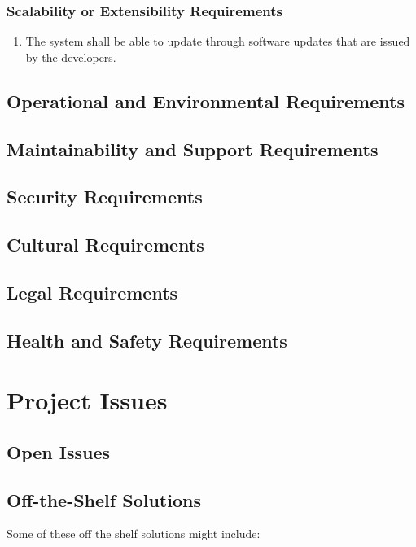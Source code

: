 \documentclass[12pt, titlepage]{article}
\begin{document}
    \subsubsection{Scalability or Extensibility Requirements}
    \begin{enumerate}[label=PR\arabic*.]
    	\item The system shall be able to update through software updates that are issued by the developers.
    \end{enumerate}
\subsection{Operational and Environmental Requirements}

\subsection{Maintainability and Support Requirements}

\subsection{Security Requirements}

\subsection{Cultural Requirements}

\subsection{Legal Requirements}

\subsection{Health and Safety Requirements}

\section{Project Issues}

\subsection{Open Issues}

\subsection{Off-the-Shelf Solutions}
Some of these off the shelf solutions might include:
\end{document}
